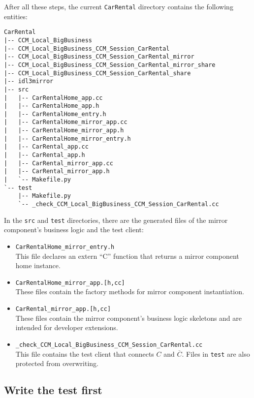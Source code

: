 After all these steps, the current {\tt CarRental} directory contains the following
entities:
\begin{small}
\begin{verbatim}
CarRental
|-- CCM_Local_BigBusiness
|-- CCM_Local_BigBusiness_CCM_Session_CarRental
|-- CCM_Local_BigBusiness_CCM_Session_CarRental_mirror
|-- CCM_Local_BigBusiness_CCM_Session_CarRental_mirror_share
|-- CCM_Local_BigBusiness_CCM_Session_CarRental_share
|-- idl3mirror
|-- src
|   |-- CarRentalHome_app.cc
|   |-- CarRentalHome_app.h
|   |-- CarRentalHome_entry.h
|   |-- CarRentalHome_mirror_app.cc
|   |-- CarRentalHome_mirror_app.h
|   |-- CarRentalHome_mirror_entry.h
|   |-- CarRental_app.cc
|   |-- CarRental_app.h
|   |-- CarRental_mirror_app.cc
|   |-- CarRental_mirror_app.h
|   `-- Makefile.py
`-- test
    |-- Makefile.py
    `-- _check_CCM_Local_BigBusiness_CCM_Session_CarRental.cc
\end{verbatim}
\end{small}

In the {\tt src} and {\tt test} directories, there are the generated files of the mirror
component's business logic and the test client:
\begin{itemize}
\item {\tt CarRentalHome\_mirror\_entry.h} \\
This file declares an extern ``C'' function 
that returns a mirror component home instance.

\item {\tt CarRentalHome\_mirror\_app.[h,cc]} \\
These files contain the factory methods for mirror component instantiation. 

\item {\tt CarRental\_mirror\_app.[h,cc]} \\
These files contain the mirror component's business logic skeletons and are intended
for developer extensions.

\item {\tt \_check\_CCM\_Local\_BigBusiness\_CCM\_Session\_CarRental.cc} \\
This file contains the test client that connects $C$ and $\overline{C}$.  
Files in {\tt test} are also protected from overwriting.
\end{itemize}  




\newpage
\subsection{Write the test first}

